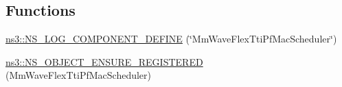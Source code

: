 \subsection*{Functions}
\begin{DoxyCompactItemize}
\item 
\hyperlink{namespacens3_a304db82194c5e9d2df8b97261a3c5f00}{ns3\+::\+N\+S\+\_\+\+L\+O\+G\+\_\+\+C\+O\+M\+P\+O\+N\+E\+N\+T\+\_\+\+D\+E\+F\+I\+NE} (\char`\"{}Mm\+Wave\+Flex\+Tti\+Pf\+Mac\+Scheduler\char`\"{})
\item 
\hyperlink{namespacens3_a3714f047fade9f2c12e4e195b05b36a6}{ns3\+::\+N\+S\+\_\+\+O\+B\+J\+E\+C\+T\+\_\+\+E\+N\+S\+U\+R\+E\+\_\+\+R\+E\+G\+I\+S\+T\+E\+R\+ED} (Mm\+Wave\+Flex\+Tti\+Pf\+Mac\+Scheduler)
\end{DoxyCompactItemize}
